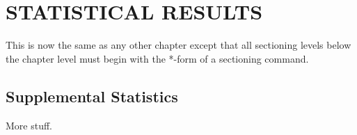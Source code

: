 \chapter{STATISTICAL RESULTS}

This is now the same as any other chapter except that
all sectioning levels below the chapter level must begin
with the *-form of a sectioning command.

\section*{Supplemental Statistics}

More stuff.
